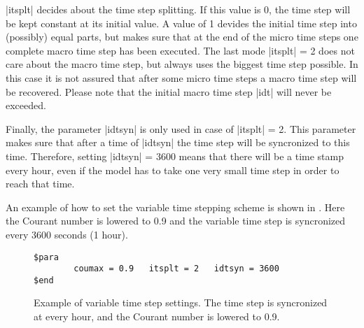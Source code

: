 |itsplt| decides about the time step splitting.  If this value is 0,
the time step will be kept constant at its initial value. A value of 1
devides the initial time step into (possibly) equal parts, but makes sure
that at the end of the micro time steps one complete macro time step has
been executed. The last mode |itsplt| = 2 does not care about the macro
time step, but always uses the biggest time step possible. In this case
it is not assured that after some micro time steps a macro time step
will be recovered. Please note that the initial macro time step |idt|
will never be exceeded.

Finally, the parameter |idtsyn| is only used in case of |itsplt| = 2.
This parameter makes sure that after a time of |idtsyn| the time step
will be syncronized to this time. Therefore, setting |idtsyn| = 3600
means that there will be a time stamp every hour, even if the model has
to take one very small time step in order to reach that time.

An example of how to set the variable time stepping scheme is shown
in \Fig{}. Here the Courant number is lowered to 0.9 and
the variable time step is syncronized every 3600 seconds (1 hour).

\begin{figure}[ht]
\begin{verbatim}
$para
        coumax = 0.9   itsplt = 2   idtsyn = 3600
$end
\end{verbatim}
\caption{Example of variable time step settings. The time step is syncronized
at every hour, and the Courant number is lowered to 0.9.}
\label{fig:vartime}
\end{figure}

